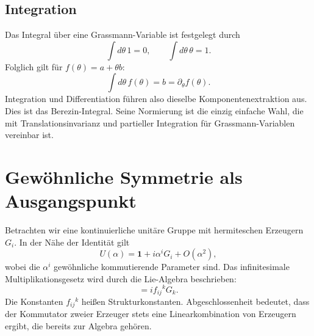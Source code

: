 \begin{classroomqa}
\end{classroomqa}

\begin{classroomqa}
\end{classroomqa}

\subsection{Integration}

Das Integral über eine Grassmann-Variable ist festgelegt durch
\begin{equation}
\int d\theta\,1=0,
\qquad
\int d\theta\,\theta=1.
\end{equation}
Folglich gilt für \(f(\theta)=a+\theta b\):
\begin{equation}
\int d\theta\,f(\theta)=b=\partial_\theta f(\theta).
\end{equation}
Integration und Differentiation führen also dieselbe Komponentenextraktion aus. Dies ist das Berezin-Integral. Seine Normierung ist die einzig einfache Wahl, die mit Translationsinvarianz und partieller Integration für Grassmann-Variablen vereinbar ist. 

\section{Gewöhnliche Symmetrie als Ausgangspunkt}

Betrachten wir eine kontinuierliche unitäre Gruppe mit hermiteschen Erzeugern \(G_i\). In der Nähe der Identität gilt
\begin{equation}
U(\alpha)=\mathbf 1+i\alpha^iG_i+O(\alpha^2),
\end{equation}
wobei die \(\alpha^i\) gewöhnliche kommutierende Parameter sind. Das infinitesimale Multiplikationsgesetz wird durch die Lie-Algebra beschrieben:
\begin{equation}
[G_i,G_j]=i f_{ij}{}^{k}G_k.
\end{equation}
Die Konstanten \(f_{ij}{}^k\) heißen Strukturkonstanten. Abgeschlossenheit bedeutet, dass der Kommutator zweier Erzeuger stets eine Linearkombination von Erzeugern ergibt, die bereits zur Algebra gehören.

